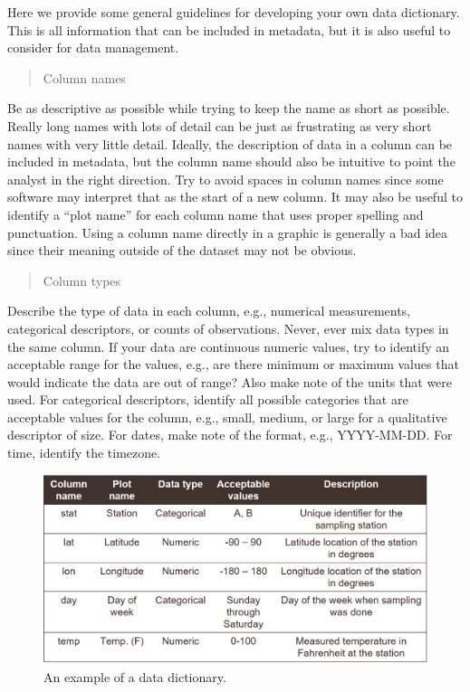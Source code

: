 \documentclass[
]{book}
\begin{document}
Here we provide some general guidelines for developing your own data dictionary. This is all information that can be included in metadata, but it is also useful to consider for data management.

\begin{quote}
Column names
\end{quote}

Be as descriptive as possible while trying to keep the name as short as possible. Really long names with lots of detail can be just as frustrating as very short names with very little detail. Ideally, the description of data in a column can be included in metadata, but the column name should also be intuitive to point the analyst in the right direction. Try to avoid spaces in column names since some software may interpret that as the start of a new column. It may also be useful to identify a ``plot name'' for each column name \citep{Broman18} that uses proper spelling and punctuation. Using a column name directly in a graphic is generally a bad idea since their meaning outside of the dataset may not be obvious.

\begin{quote}
Column types
\end{quote}

Describe the type of data in each column, e.g., numerical measurements, categorical descriptors, or counts of observations. Never, ever mix data types in the same column. If your data are continuous numeric values, try to identify an acceptable range for the values, e.g., are there minimum or maximum values that would indicate the data are out of range? Also make note of the units that were used. For categorical descriptors, identify all possible categories that are acceptable values for the column, e.g., small, medium, or large for a qualitative descriptor of size. For dates, make note of the format, e.g., YYYY-MM-DD. For time, identify the timezone.

\begin{figure}

{\centering \includegraphics[width=0.8\linewidth]{img/datadict} 

}

\caption{An example of a data dictionary.}\label{fig:datadict}
\end{figure}
\end{document}

